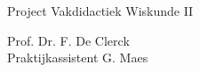 \documentclass[12pt]{article}
\numberwithin{equation}{section} %
\theoremstyle{plain}  \newtheorem{stel}{Stelling}[section]
\theoremstyle{plain}  \newtheorem{lemma}[stel]{Lemma}
\theoremstyle{plain}  \newtheorem{gevolg}[stel]{Gevolg}
\theoremstyle{definition}  \newtheorem{defi}[stel]{Definitie}
\theoremstyle{definition} \newtheorem{vb}[stel]{Voorbeeld}
\theoremstyle{definition} \newtheorem{vbn}[stel]{Voorbeelden}
\theoremstyle{definition}  \newtheorem{opm}[stel]{Opmerking}
\theoremstyle{plain}  \newtheorem{opdracht}{Opdracht}
\begin{document}
\hspace*{\fill}
\begin{minipage}{8cm}
\noindent   Project Vakdidactiek Wiskunde II
\end{minipage}

  \bigskip

  \hspace*{\fill}
  \begin{minipage}{8cm}
  \noindent  Prof. Dr.  F. De Clerck\\
  Praktijkassistent G. Maes
\end{minipage}

\newpage
\tableofcontents 
\newpage



\newpage

\newpage

\newpage

\newpage

\newpage

\end{document}

